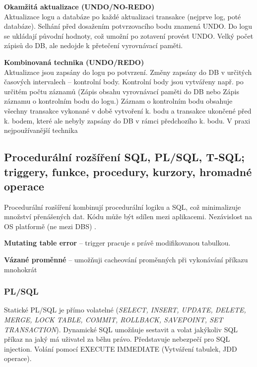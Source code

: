 \textbf{Okamžitá aktualizace (UNDO/NO-REDO)}\\
Aktualizace logu a databáze po každé aktualizaci transakce (nejprve log, poté databáze). Selhání před dosažením potvrzovacího bodu znamená UNDO.
Do logu se ukládají původní hodnoty, což umožní po zotavení provést UNDO. Velký počet zápisů do DB, ale nedojde k přetečení vyrovnávací paměti.

\textbf{Kombinovaná technika (UNDO/REDO)}\\
Aktualizace jsou zapsány do logu po potvrzení. Změny zapsány do DB v určitých časových intervalech – kontrolní body. Kontrolní body jsou vytvářeny např. po určitém počtu záznamů  (Zápis obsahu vyrovnávací paměti do DB nebo Zápis záznamu o kontrolním bodu do logu.)
Záznam o kontrolním bodu obsahuje všechny transakce vykonané v době vytvoření k. bodu a transakce ukončené před k. bodem, které ale nebyly zapsány do DB v rámci předchozího k. bodu. V praxi nejpoužívanější technika

\subsection[Procedurální rozšíření SQL]{Procedurální rozšíření SQL, PL/SQL, T-SQL; triggery, funkce, procedury, kurzory, hromadné operace}
Procedurální rozšíření kombinují procedurální logiku a SQL, což minimalizuje množství přenášených dat. Kódu může být sdílen mezi aplikacemi. Nezávislost na OS platformě (ne mezi DBS) .

\textbf{Mutating table error} -- trigger pracuje s právě modifikovanou tabulkou.

\textbf{Vázané proměnné} -- umožňuji cacheování proměnných při vykonávání příkazu mnohokrát

\subsubsection{PL/SQL}
Statické PL/SQL je přímo volatelné (\textit{SELECT, INSERT, UPDATE, DELETE, MERGE, LOCK TABLE, COMMIT, ROLLBACK, SAVEPOINT, SET TRANSACTION}).
Dynamické SQL umožňuje sestavit a volat jakýkoliv SQL příkaz na jaký má uživatel za běhu právo. Představuje nebezpečí pro SQL injection. Volání pomocí EXECUTE IMMEDIATE (Vytváření tabulek, JDD operace).

